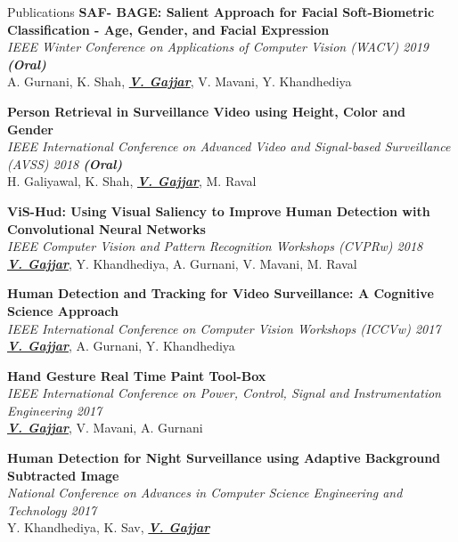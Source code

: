 \documentclass{resume}
\begin{document}
\begin{rSection}{Publications}
{\bf SAF- BAGE: Salient Approach for Facial Soft-Biometric Classification - Age,
Gender, and Facial Expression} \\
\textit{IEEE Winter Conference on Applications of Computer Vision (WACV) 2019 \bf{(Oral)}} \\
{A. Gurnani, K. Shah, \underline{\bf{\textit{V. Gajjar}}}, V. Mavani, Y. Khandhediya}

{\bf Person Retrieval in Surveillance Video using Height, Color and Gender} \\
\textit{IEEE International Conference on Advanced Video and Signal-based Surveillance (AVSS) 2018 \bf{(Oral)}} \\
{H. Galiyawal, K. Shah, \underline{\bf{\textit{V. Gajjar}}}, M. Raval} 

{\bf ViS-Hud: Using Visual Saliency to Improve Human Detection with Convolutional Neural Networks} \\
\textit{IEEE Computer Vision and Pattern Recognition Workshops (CVPRw) 2018} \\
{\underline{\bf{\textit{V. Gajjar}}}, Y. Khandhediya, A. Gurnani, V. Mavani, M. Raval} 

{\bf Human Detection and Tracking for Video Surveillance: A Cognitive Science
Approach} \\
\textit{IEEE International Conference on Computer Vision Workshops (ICCVw) 2017} \\
{\underline{\bf{\textit{V. Gajjar}}}, A. Gurnani, Y. Khandhediya} 

{\bf Hand Gesture Real Time Paint Tool-Box} \\
\textit{IEEE International Conference on Power, Control, Signal and Instrumentation Engineering 2017 } \\
{\underline{\bf{\textit{V. Gajjar}}}, V. Mavani, A. Gurnani} 

{\bf Human Detection for Night Surveillance using Adaptive Background Subtracted Image} \\
\textit{National Conference on Advances in Computer Science Engineering and Technology 2017 } \\
{Y. Khandhediya, K. Sav, \underline{\bf{\textit{V. Gajjar}}}} 
\end{rSection} 
\end{document}
